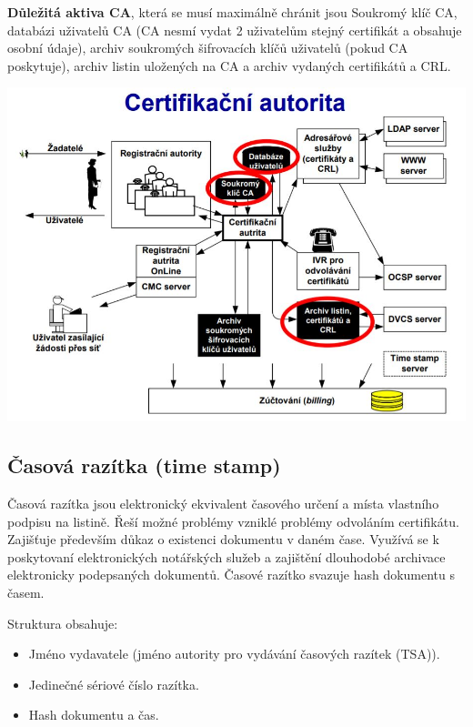 \vspace{0,3cm}
\noindent \textbf{Důležitá aktiva CA}, která se musí maximálně chránit jsou Soukromý klíč CA, databázi uživatelů CA (CA nesmí vydat 2 uživatelům stejný certifikát a obsahuje osobní údaje), archiv soukromých šifrovacích klíčů uživatelů (pokud CA poskytuje), archiv listin uložených na CA a archiv vydaných certifikátů a CRL.
\begin{center}
\includegraphics[scale=0.5]{images/CA.jpg}
\end{center}


\subsection{Časová razítka (time stamp)}

Časová razítka jsou elektronický ekvivalent časového určení a místa vlastního podpisu na listině. Řeší možné problémy vzniklé problémy odvoláním certifikátu. Zajišťuje především důkaz o existenci dokumentu v daném čase. Využívá se k poskytovaní elektronických notářských služeb a zajištění dlouhodobé archivace elektronicky podepsaných dokumentů. Časové razítko svazuje hash dokumentu s časem.

\noindent Struktura obsahuje:
\begin{itemize}[noitemsep]
    \item Jméno vydavatele (jméno autority pro vydávání časových razítek (TSA)).
    \item Jedinečné sériové číslo razítka.
    \item Hash dokumentu a čas.
\end{itemize}

